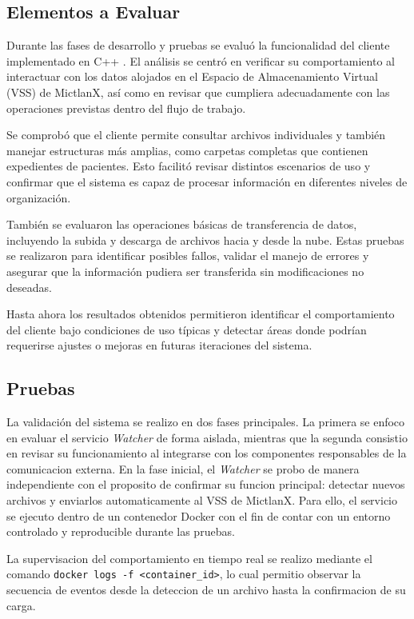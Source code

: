 \subsection{Elementos a Evaluar}

Durante las fases de desarrollo y pruebas se evaluó la funcionalidad del cliente implementado en C++ \cite{Stroustrup:2013:cpp}. El análisis se centró en verificar su comportamiento al interactuar con los datos alojados en el Espacio de Almacenamiento Virtual (VSS) de MictlanX, así como en revisar que cumpliera adecuadamente con las operaciones previstas dentro del flujo de trabajo.

Se comprobó que el cliente permite consultar archivos individuales y también manejar estructuras más amplias, como carpetas completas que contienen expedientes de pacientes. Esto facilitó revisar distintos escenarios de uso y confirmar que el sistema es capaz de procesar información en diferentes niveles de organización.

También se evaluaron las operaciones básicas de transferencia de datos, incluyendo la subida y descarga de archivos hacia y desde la nube. Estas pruebas se realizaron para identificar posibles fallos, validar el manejo de errores y asegurar que la información pudiera ser transferida sin modificaciones no deseadas.

Hasta ahora los resultados obtenidos permitieron identificar el comportamiento del cliente bajo condiciones de uso típicas y detectar áreas donde podrían requerirse ajustes o mejoras en futuras iteraciones del sistema.

\newpage

\subsection{Pruebas}
La validación del sistema se realizo en dos fases principales. La primera se enfoco en evaluar el servicio \textit{Watcher} de forma aislada, mientras que la segunda consistio en revisar su funcionamiento al integrarse con los componentes responsables de la comunicacion externa.
En la fase inicial, el \textit{Watcher} se probo de manera independiente con el proposito de confirmar su funcion principal: detectar nuevos archivos y enviarlos automaticamente al VSS de MictlanX. Para ello, el servicio se ejecuto dentro de un contenedor Docker con el fin de contar con un entorno controlado y reproducible durante las pruebas. 

La supervisacion del comportamiento en tiempo real se realizo mediante el comando \texttt{docker logs -f <container\_id>}, lo cual permitio observar la secuencia de eventos desde la deteccion de un archivo hasta la confirmacion de su carga.

